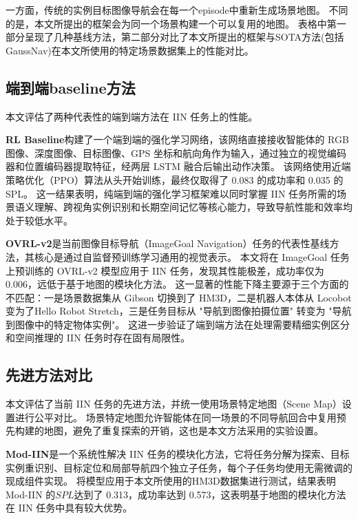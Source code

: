 一方面，传统的实例目标图像导航会在每一个episode中重新生成场景地图。
不同的是，本文所提出的框架会为同一个场景构建一个可以复用的地图。
表格中第一部分呈现了几种基线方法，第二部分对比了本文所提出的框架与SOTA方法(包括GaussNav\cite{gaussnav})在本文所使用的特定场景数据集上的性能对比。

\subsection{端到端baseline方法}
本文评估了两种代表性的端到端方法在 IIN 任务上的性能。

\textbf{RL Baseline}\cite{krantz2022instance}构建了一个端到端的强化学习网络，该网络直接接收智能体的 RGB 图像、深度图像、目标图像、GPS 坐标和航向角作为输入，通过独立的视觉编码器和位置编码器提取特征，经两层 LSTM 融合后输出动作决策。
该网络使用近端策略优化（PPO）算法从头开始训练，最终仅取得了 0.083 的成功率和 0.035 的 SPL。
这一结果表明，纯端到端的强化学习框架难以同时掌握 IIN 任务所需的场景语义理解、跨视角实例识别和长期空间记忆等核心能力，导致导航性能和效率均处于较低水平。

\textbf{OVRL-v2}\cite{yadav2023ovrl}是当前图像目标导航（ImageGoal Navigation）任务的代表性基线方法，其核心是通过自监督预训练学习通用的视觉表示。
本文将在 ImageGoal 任务上预训练的 OVRL-v2 模型应用于 IIN 任务，发现其性能极差，成功率仅为 0.006，远低于基于地图的模块化方法。
这一显著的性能下降主要源于三个方面的不匹配：一是场景数据集从 Gibson\cite{xia2018gibson} 切换到了 HM3D，二是机器人本体从 Locobot\cite{locobot_official_website} 变为了Hello Robot Stretch\cite{hello_robot_stretch_2}，三是任务目标从 "导航到图像拍摄位置" 转变为 "导航到图像中的特定物体实例"。
这进一步验证了端到端方法在处理需要精细实例区分和空间推理的 IIN 任务时存在固有局限性。

\subsection{先进方法对比}
本文评估了当前 IIN 任务的先进方法，并统一使用场景特定地图（Scene Map）设置进行公平对比。
场景特定地图允许智能体在同一场景的不同导航回合中复用预先构建的地图，避免了重复探索的开销，这也是本文方法采用的实验设置。

\textbf{Mod-IIN}\cite{krantz2023navigating}是一个系统性解决 IIN 任务的模块化方法，它将任务分解为探索、目标实例重识别、目标定位和局部导航四个独立子任务，每个子任务均使用无需微调的现成组件实现。
将模型应用于本文所使用的HM3D数据集进行测试，结果表明Mod-IIN 的$SPL$达到了 0.313，成功率达到 0.573，这表明基于地图的模块化方法在 IIN 任务中具有较大优势。

